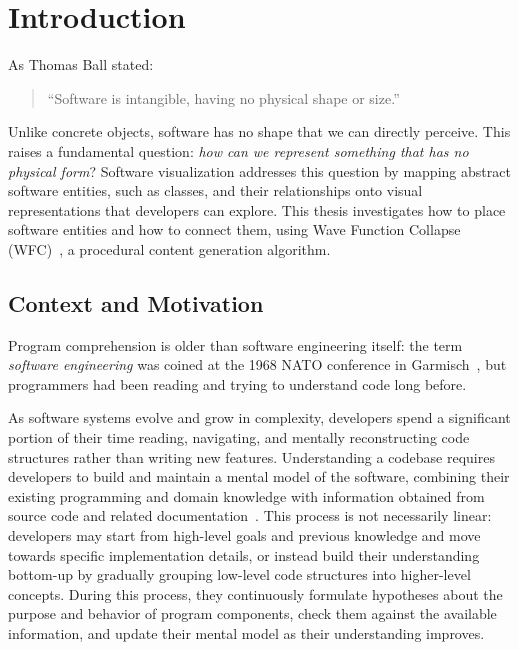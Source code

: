 \documentclass[../main.tex]{subfiles}
\begin{document}
\chapter{Introduction}
\setcounter{page}{1}
\label{chap:introduction}

As Thomas Ball stated:
\begin{quote}
    ``Software is intangible, having no physical shape or size.''~
\end{quote}

Unlike concrete objects, software has no shape that we can directly perceive. This raises a fundamental question: \emph{how can we represent something that has no physical form}? Software visualization addresses this question by mapping abstract software entities, such as classes, and their relationships onto visual representations that developers can explore. This thesis investigates how to place software entities and how to connect them, using Wave Function Collapse (WFC)~, a procedural content generation algorithm.

\section{Context and Motivation}
\label{sec:intro_motivation}

Program comprehension is older than software engineering itself: the term \emph{software engineering} was coined at the 1968 NATO conference in Garmisch~, but programmers had been reading and trying to understand code long before.

As software systems evolve and grow in complexity, developers spend a significant portion of their time reading, navigating, and mentally reconstructing code structures rather than writing new features. Understanding a codebase requires developers to build and maintain a mental model of the software, combining their existing programming and domain knowledge with information obtained from source code and related documentation~. This process is not necessarily linear: developers may start from high-level goals and previous knowledge and move towards specific implementation details, or instead build their understanding bottom-up by gradually grouping low-level code structures into higher-level concepts. During this process, they continuously formulate hypotheses about the purpose and behavior of program components, check them against the available information, and update their mental model as their understanding improves.
\end{document}
